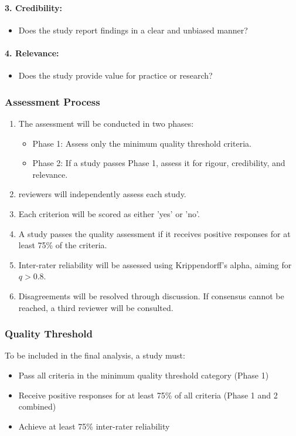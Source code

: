 \documentclass[acmsmall]{acmart}
\begin{document}
\paragraph{3. Credibility:}
\begin{itemize}
    \item Does the study report findings in a clear and unbiased manner?
\end{itemize}

\paragraph{4. Relevance:}
\begin{itemize}
    \item Does the study provide value for practice or research?
\end{itemize}

\subsubsection{Assessment Process}\label{subsubsec:phase-3-quality-assessment:assessment-process}
\begin{enumerate}
    \item The assessment will be conducted in two phases:
          \begin{itemize}
              \item Phase 1: Assess only the minimum quality threshold criteria.
              \item Phase 2: If a study passes Phase 1, assess it for rigour, credibility, and relevance.
          \end{itemize}
    \item reviewers will independently assess each study.
    \item Each criterion will be scored as either 'yes' or 'no'.
    \item A study passes the quality assessment if it receives positive responses for at least 75\% of the criteria.
    \item Inter-rater reliability will be assessed using Krippendorff's alpha, aiming for $q > 0.8$.
    \item Disagreements will be resolved through discussion. If consensus cannot be reached, a third reviewer will be consulted.
\end{enumerate}

\subsubsection{Quality Threshold}\label{subsubsec:phase-3-quality-assessment:quality-threshold}
To be included in the final analysis, a study must:
\begin{itemize}
    \item Pass all criteria in the minimum quality threshold category (Phase 1)
    \item Receive positive responses for at least 75\% of all criteria (Phase 1 and 2 combined)
    \item Achieve at least 75\% inter-rater reliability
\end{itemize}
\end{document}
